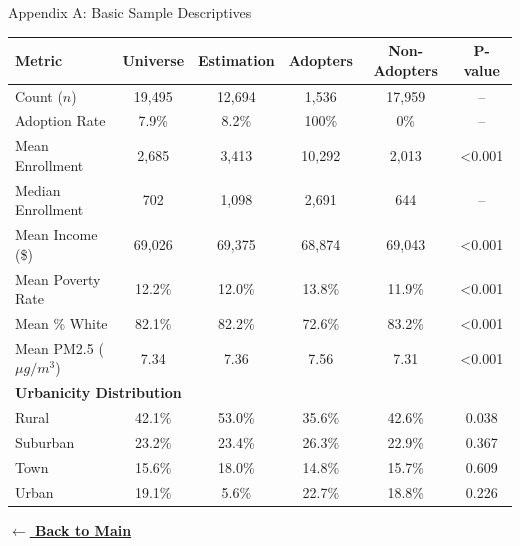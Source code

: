 \documentclass[aspectratio=169]{beamer}
\begin{document}
\appendix
\begin{frame}[label=app_summary]{Appendix A: Basic Sample Descriptives}
    \centering
    \begin{table}
        \small
        \begin{tabular}{lccccc}
            \toprule
            \textbf{Metric} & \textbf{Universe} & \textbf{Estimation} & \textbf{Adopters} & \textbf{Non-Adopters} & \textbf{P-value} \\
            \midrule
            Count ($n$) & 19,495 & 12,694 & 1,536 & 17,959 & -- \\
            Adoption Rate & 7.9\% & 8.2\% & 100\% & 0\% & -- \\
            Mean Enrollment & 2,685 & 3,413 & 10,292 & 2,013 & <0.001 \\
            Median Enrollment & 702 & 1,098 & 2,691 & 644 & -- \\
            Mean Income (\$) & 69,026 & 69,375 & 68,874 & 69,043 & <0.001 \\
            Mean Poverty Rate & 12.2\% & 12.0\% & 13.8\% & 11.9\% & <0.001 \\
            Mean \% White & 82.1\% & 82.2\% & 72.6\% & 83.2\% & <0.001 \\ 
            Mean PM2.5 ($\mu g/m^3$) & 7.34 & 7.36 & 7.56 & 7.31 & <0.001 \\
            \midrule
            \multicolumn{6}{l}{\textbf{Urbanicity Distribution}} \\
            Rural & 42.1\% & 53.0\% & 35.6\% & 42.6\% & 0.038 \\
            Suburban & 23.2\% & 23.4\% & 26.3\% & 22.9\% & 0.367 \\
            Town & 15.6\% & 18.0\% & 14.8\% & 15.7\% & 0.609 \\
            Urban & 19.1\% & 5.6\% & 22.7\% & 18.8\% & 0.226 \\
            \bottomrule
        \end{tabular}
    \end{table}
    \vspace{0.2cm}
    \hyperlink{summary_balance}{\textbf{\color{mLightBrown} $\leftarrow$ Back to Main}}
\end{frame}
\end{document}
